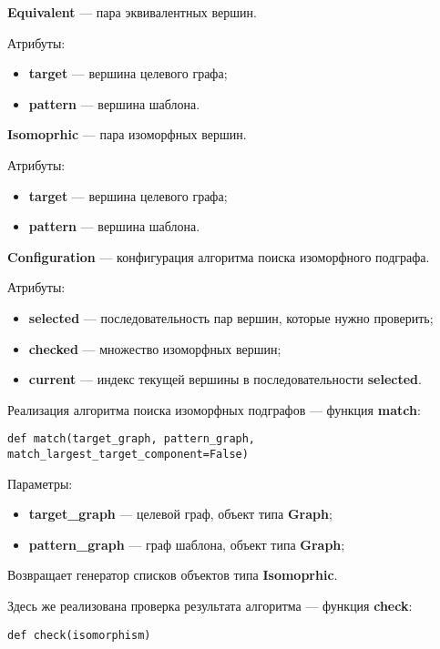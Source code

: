 \textbf{Equivalent} --- пара эквивалентных вершин.

Атрибуты:
\begin{itemize}
\item \textbf{target} --- вершина целевого графа;
\item \textbf{pattern} --- вершина шаблона.
\end{itemize}

\textbf{Isomoprhic} --- пара изоморфных вершин.

Атрибуты:
\begin{itemize}
\item \textbf{target} --- вершина целевого графа;
\item \textbf{pattern} --- вершина шаблона.
\end{itemize}

\textbf{Configuration} --- конфигурация алгоритма поиска изоморфного подграфа.

Атрибуты:
\begin{itemize}
\item \textbf{selected} --- последовательность пар вершин, которые нужно проверить;
\item \textbf{checked} --- множество изоморфных вершин;
\item \textbf{current} --- индекс текущей вершины в последовательности \textbf{selected}.
\end{itemize}

Реализация алгоритма поиска изоморфных подграфов --- функция \textbf{match}:

\begin{verbatim}
def match(target_graph, pattern_graph, match_largest_target_component=False)
\end{verbatim}

Параметры:
\begin{itemize}
\item \textbf{target\_graph} --- целевой граф, объект типа \textbf{Graph};
\item \textbf{pattern\_graph} --- граф шаблона, объект типа \textbf{Graph};
\end{itemize}

Возвращает генератор списков объектов типа \textbf{Isomoprhic}.

Здесь же реализована проверка результата алгоритма --- функция \textbf{check}:

\begin{verbatim}
def check(isomorphism)
\end{verbatim}

